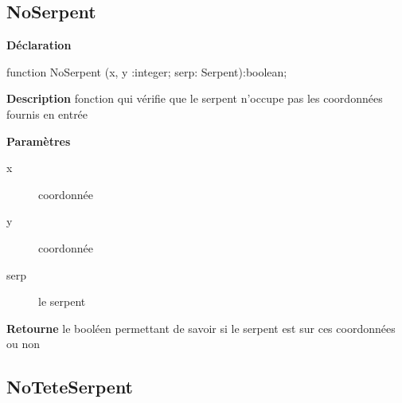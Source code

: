 \documentclass{report}
\newif\ifpdf
\begin{document}
\subsection*{NoSerpent}
\fi
\label{Generation-NoSerpent}
\begin{list}{}{
\setlength{\itemindent}{0cm}
\setlength{\listparindent}{0cm}
\setlength{\leftmargin}{\evensidemargin}
\addtolength{\leftmargin}{\tmplength}
\settowidth{\labelsep}{X}
\addtolength{\leftmargin}{\labelsep}
\setlength{\labelwidth}{\tmplength}
}
\item[\textbf{Déclaration}\hfill]
\ifpdf
\begin{flushleft}
\fi
\begin{ttfamily}
function NoSerpent (x, y :integer; serp: Serpent):boolean;\end{ttfamily}

\ifpdf
\end{flushleft}
\fi

\par
\item[\textbf{Description}]
fonction qui vérifie que le serpent n'occupe pas les coordonnées fournis en entrée    \par
\item[\textbf{Paramètres}]
\begin{description}
\item[x] coordonnée
\item[y] coordonnée
\item[serp] le serpent
\end{description}
\item[\textbf{Retourne}]le booléen permettant de savoir si le serpent est sur ces coordonnées ou non


\end{list}
\ifpdf
\subsection*{\large{\textbf{NoTeteSerpent}}\normalsize\hspace{1ex}\hrulefill}
\else
\end{document}
